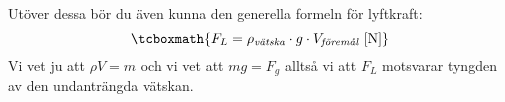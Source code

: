 Utöver dessa bör du även kunna den generella formeln för lyftkraft:
\begin{equation*}
    \tcboxmath{F_L = \rho_{\textit{vätska}} \cdot g \cdot V_{\textit{föremål}} \, \left[\mathrm{N}\right]}
\end{equation*}
Vi vet ju att $\rho V = m$ och vi vet att $mg=F_g$ alltså vi att $F_L$ motsvarar tyngden av den undanträngda vätskan.